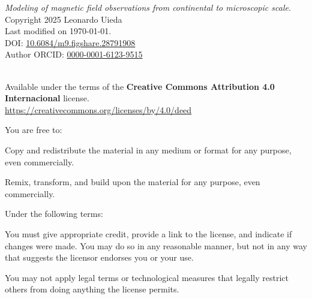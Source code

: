 \documentclass[10pt,a4paper,oneside]{book}
\newcommand{\ThesisYear}{2025}
\newcommand{\ThesisAuthor}{Leonardo Uieda}
\newcommand{\ThesisTitle}{Modeling of magnetic field observations from continental to microscopic scale}
\newcommand{\ThesisDOI}{10.6084/m9.figshare.28791908}
\newcommand{\ORCID}{0000-0001-6123-9515}
\begin{document}
{\small

\vspace*{\fill}

\noindent
\textit{\ThesisTitle{}}.
\\[0.2cm]
\textcopyright{} Copyright \ThesisYear{} \ThesisAuthor{}
\\[0.2cm]
Last modified on \today.
\\[0.2cm]
DOI: \href{https://doi.org/\ThesisDOI}{\ThesisDOI}
\\[0.2cm]
Author ORCID: \href{https://orcid.org/\ORCID}{\ORCID}

\vspace{2.5cm}

\noindent
\textbf{\LARGE \faCreativeCommons{} \faCreativeCommonsBy{}}
\\
Available under the terms of the
\textbf{Creative Commons Attribution 4.0 Internacional} license.
\\
\url{https://creativecommons.org/licenses/by/4.0/deed}

\vspace{0.25cm}

\noindent
You are free to:

\begin{description}[labelindent=0.5cm]
    \item[Share ---]{
        Copy and redistribute the material in any medium or format for any
        purpose, even commercially.
    }
    \item[Adapt ---]{
        Remix, transform, and build upon the material for any purpose, even
        commercially.
    }
\end{description}

\vspace{0.25cm}

\noindent
Under the following terms:

\begin{description}[labelindent=0.5cm]
    \item[Attribution ---]{
        You must give appropriate credit, provide a link to the license, and
        indicate if changes were made. You may do so in any reasonable manner,
        but not in any way that suggests the licensor endorses you or your use.
    }
    \item[No additional restrictions ---]{
        You may not apply legal terms or technological measures that legally
        restrict others from doing anything the license permits.
}
\end{description}

\vspace{2cm}

}
\end{document}
